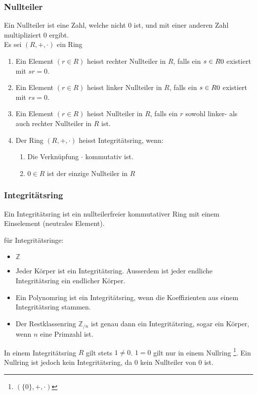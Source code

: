 \subsubsection*{Nullteiler}
\begin{definition}
Ein Nullteiler ist eine Zahl, welche nicht 0 ist, und mit einer anderen Zahl multipliziert 0 ergibt.\\
Es sei $(R, +, \cdot)$ ein Ring
	\begin{enumerate}
		\item Ein Element $(r \in R)$ heisst rechter Nullteiler in $R$, falls ein $s \in R\\{0}$ existiert mit $sr = 0$.
		\item Ein Element $(r \in R)$ heisst linker Nullteiler in $R$, falls ein $s \in R\\{0}$ existiert mit $rs = 0$.
		\item Ein Element $(r \in R)$ heisst Nullteiler in $R$, falls ein $r$ sowohl linker- als auch rechter Nullteiler in $R$ ist.
		\item Der Ring $(R, +, \cdot)$ heisst Integritätsring, wenn:
		\begin{enumerate}
			\item Die Verknüpfung $\cdot$ kommutativ ist.
			\item $0 \in R$ ist der einzige Nullteiler in $R$
		\end{enumerate}
	\end{enumerate}
\end{definition}

\subsubsection*{Integritätsring}
Ein Integritätsring ist ein nullteilerfreier kommutativer Ring mit einem Einselement (neutrales Element).
\begin{bsp} für Integritätsringe:
\begin{itemize}
	\item $\mathbb{Z}$
	\item Jeder Körper ist ein Integritätsring. Ausserdem ist jeder endliche Integritätsring ein endlicher Körper.
	\item Ein Polynomring ist ein Integritätsring, wenn die Koeffizienten aus einem Integritätsring stammen.
	\item Der Restklassenring $\mathbb{Z}_{/n}$  ist genau dann ein Integritätsring, sogar ein Körper, wenn $n$ eine Primzahl ist.
\end{itemize}
\end{bsp} 
 \begin{bem}
In einem Integritätsring $R$ gilt stets $1 \neq 0$. $1=0$ gilt nur in einem Nullring \footnote{$(\{0\}, +, \cdot)$}. Ein Nullring ist jedoch kein Integritätsring, da $0$ kein Nullteiler von $0$ ist.
\end{bem}

